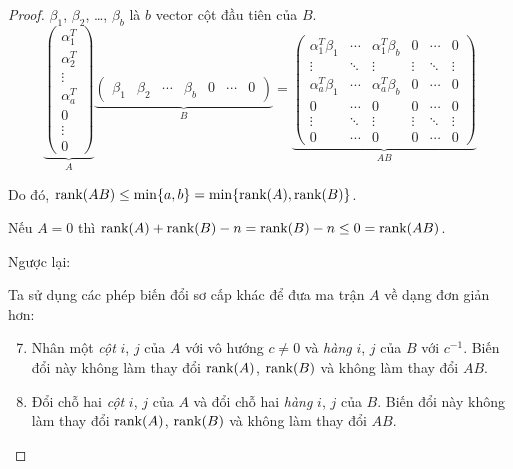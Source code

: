 \documentclass[class=linear-algebra,crop=false]{standalone}
\begin{document}
\begin{proof}
	\par $\beta_{1}$, $\beta_{2}$, \ldots, $\beta_{b}$ là $b$ vector cột đầu tiên của $B$.
	\[
		\underbrace{\begin{pmatrix}
				\alpha_{1}^{T} \\
				\alpha_{2}^{T} \\
				\vdots         \\
				\alpha_{a}^{T} \\
				0              \\
				\vdots         \\
				0
			\end{pmatrix}}_{A}
		\underbrace{\begin{pmatrix}
				\beta_{1} & \beta_{2} & \cdots & \beta_{b} & 0 & \cdots & 0
			\end{pmatrix}}_{B}
		=
		\underbrace{\begin{pmatrix}
				\alpha_{1}^{T}\beta_{1} & \cdots & \alpha_{1}^{T}\beta_{b} & 0      & \cdots & 0      \\
				\vdots                  & \ddots & \vdots                  & \vdots & \ddots & \vdots \\
				\alpha_{a}^{T}\beta_{1} & \cdots & \alpha_{a}^{T}\beta_{b} & 0      & \cdots & 0      \\
				0                       & \cdots & 0                       & 0      & \cdots & 0      \\
				\vdots                  & \ddots & \vdots                  & \vdots & \ddots & \vdots \\
				0                       & \cdots & 0                       & 0      & \cdots & 0
			\end{pmatrix}}_{AB}
	\]
	\par Do đó, $\text{rank}(AB)\le \min\{ a, b \} = \min\{ \text{rank}(A), \text{rank}(B) \}$.
	\bigskip
	\par Nếu $A = 0$ thì $\text{rank}(A) + \text{rank}(B) - n = \text{rank}(B) - n\le 0 = \text{rank}(AB)$.
	\par Ngược lại:
	\par Ta sử dụng các phép biến đổi sơ cấp khác để đưa ma trận $A$ về dạng đơn giản hơn:
	\begin{enumerate}[label = (\roman*)]
		\setcounter{enumi}{6}
		\item Nhân một \textit{cột} $i$, $j$ của $A$ với vô hướng $c\ne 0$ và \textit{hàng} $i$, $j$ của $B$ với $c^{-1}$. Biến đổi này không làm thay đổi $\text{rank}(A)$, $\text{rank}(B)$ và không làm thay đổi $AB$.
		\item Đổi chỗ hai \textit{cột} $i$, $j$ của $A$ và đổi chỗ hai \textit{hàng} $i$, $j$ của $B$. Biến đổi này không làm thay đổi $\text{rank}(A)$, $\text{rank}(B)$ và không làm thay đổi $AB$.

\end{enumerate}
\end{proof}
\end{document}
